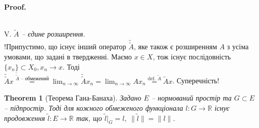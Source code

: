 \documentclass[a4paper, 10pt]{article}
\makeatletter
\theoremstyle{theoremdd}
\newtheorem{theorem}{Theorem}[subsection]
\theoremstyle{theoremdd}
\theoremstyle{theoremdd}
\theoremstyle{theoremdd}
\theoremstyle{theoremdd}
\theoremstyle{theoremdd}
\theoremstyle{theoremdd}
\theoremstyle{theoremdd}
\renewenvironment{proof}[1][Proof.\\]{\par
\pushQED{\hfill \qed}%
\normalfont \topsep6\p@\@plus6\p@\relax
\trivlist
\item\relax
{\bfseries
#1\@addpunct{.}}\hspace\labelsep\ignorespaces
}{%
\popQED\endtrivlist\@endpefalse
}
\makeatother
\begin{document}
\begin{proof}
\bigskip \\
V. \textit{$\tilde{A}$ -- єдине розширення}.\\
!Припустимо, що існує інший оператор $\tilde{\tilde{A}}$, яке також є розширенням $A$ з усіма умовами, що задані в твердженні. Маємо $x \in X$, тож існує послідовність $\{x_n\} \subset X_0, x_n \to x$. Тоді\\
$\tilde{\tilde{A}}x \overset{\tilde{\tilde{A}} \text{ -- обмежений}}{=} \displaystyle\lim_{n \to \infty} \tilde{\tilde{A}}x_n = \lim_{n \to \infty} Ax_n \overset{\text{def. } \tilde{A}}{=} \tilde{A}x$. Суперечність!
\end{proof}

\begin{theorem}[Теорема Гана-Банаха]
Задано $E$ -- нормований простір та $G \subset E$ -- підпростір. Тоді для кожного обмеженого функціонала $l \colon G \to \mathbb{R}$ існує продовження $\tilde{l} \colon E \to \mathbb{R}$ так, що $\tilde{l}|_G = l,\ \| \tilde{l} \| = \|l\|$.
\end{theorem}
\end{document}
